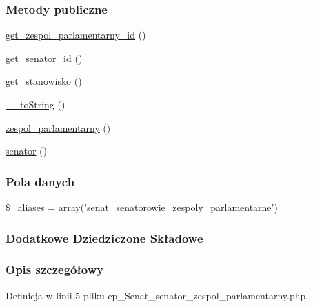 \subsubsection*{Metody publiczne}
\begin{DoxyCompactItemize}
\item 
\hyperlink{classep___senat__senator__zespol__parlamentarny_a79f62ca37b2fbee380dd942dd0c375cd}{get\-\_\-zespol\-\_\-parlamentarny\-\_\-id} ()
\item 
\hyperlink{classep___senat__senator__zespol__parlamentarny_aa0c141b1e9aba9fed3eb13ed8901de76}{get\-\_\-senator\-\_\-id} ()
\item 
\hyperlink{classep___senat__senator__zespol__parlamentarny_a24e5fcbf4661581e53314bf23f908b7a}{get\-\_\-stanowisko} ()
\item 
\hyperlink{classep___senat__senator__zespol__parlamentarny_a7516ca30af0db3cdbf9a7739b48ce91d}{\-\_\-\-\_\-to\-String} ()
\item 
\hyperlink{classep___senat__senator__zespol__parlamentarny_ab35c0c9aed2d5fc6af85be9289f9f2a1}{zespol\-\_\-parlamentarny} ()
\item 
\hyperlink{classep___senat__senator__zespol__parlamentarny_af076312b536f7707cda87563bd9113d9}{senator} ()
\end{DoxyCompactItemize}
\subsubsection*{Pola danych}
\begin{DoxyCompactItemize}
\item 
\hyperlink{classep___senat__senator__zespol__parlamentarny_ab4e31d75f0bc5d512456911e5d01366b}{\$\-\_\-aliases} = array('senat\-\_\-senatorowie\-\_\-zespoly\-\_\-parlamentarne')
\end{DoxyCompactItemize}
\subsubsection*{Dodatkowe Dziedziczone Składowe}


\subsubsection{Opis szczegółowy}


Definicja w linii 5 pliku ep\-\_\-\-Senat\-\_\-senator\-\_\-zespol\-\_\-parlamentarny.\-php.



